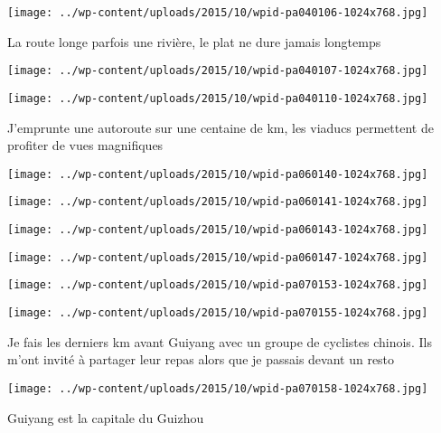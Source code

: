  \newline
\centerline{\texttt{[image: ../wp-content/uploads/2015/10/wpid-pa040106-1024x768.jpg]} } 
 \newline
 La route longe parfois une rivière, le plat ne dure jamais longtemps \newline
 \newline
\centerline{\texttt{[image: ../wp-content/uploads/2015/10/wpid-pa040107-1024x768.jpg]} } 
 \newline
 \newline
\centerline{\texttt{[image: ../wp-content/uploads/2015/10/wpid-pa040110-1024x768.jpg]} } 
 \newline
 J'emprunte une autoroute sur une centaine de km, les viaducs permettent de profiter de vues magnifiques \newline
 \newline
\centerline{\texttt{[image: ../wp-content/uploads/2015/10/wpid-pa060140-1024x768.jpg]} } 
 \newline
 \newline
\centerline{\texttt{[image: ../wp-content/uploads/2015/10/wpid-pa060141-1024x768.jpg]} } 
 \newline
 \newline
\centerline{\texttt{[image: ../wp-content/uploads/2015/10/wpid-pa060143-1024x768.jpg]} } 
 \newline
 \newline
\centerline{\texttt{[image: ../wp-content/uploads/2015/10/wpid-pa060147-1024x768.jpg]} } 
 \newline
 \newline
\centerline{\texttt{[image: ../wp-content/uploads/2015/10/wpid-pa070153-1024x768.jpg]} } 
 \newline
 \newline
\centerline{\texttt{[image: ../wp-content/uploads/2015/10/wpid-pa070155-1024x768.jpg]} } 
 \newline
 Je fais les derniers km avant Guiyang avec un groupe de cyclistes chinois. Ils m'ont invité à partager leur repas alors que je passais devant un resto \newline
 \newline
\centerline{\texttt{[image: ../wp-content/uploads/2015/10/wpid-pa070158-1024x768.jpg]} } 
 \newline
 Guiyang est la capitale du Guizhou \newline
 \newline
